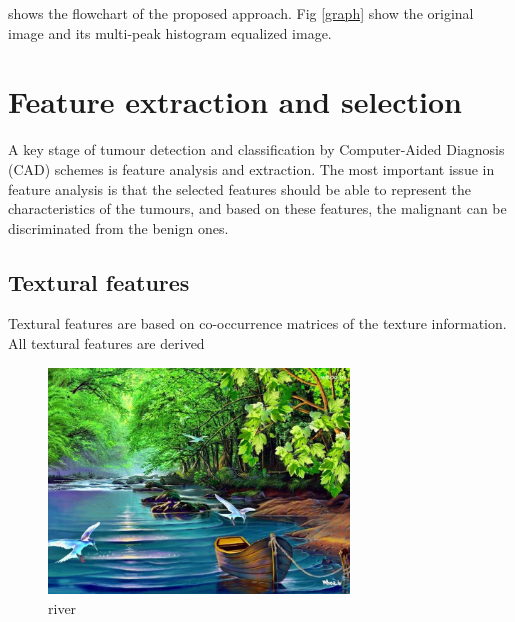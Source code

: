  shows the flowchart of the proposed approach. Fig \ref{graph} show the original image and its multi-peak histogram equalized image.
    
\section{ Feature extraction and selection} 

A key stage of tumour detection and classification by Computer-Aided Diagnosis (CAD) schemes is feature analysis and extraction. The most important issue in feature analysis is that the selected features should be able to represent the characteristics of the tumours, and based on these features, the malignant can be discriminated from the benign ones.
\subsection {Textural features}
Textural features are based on co-occurrence matrices of the texture information. All textural features are derived 
\begin{figure}[h]
\centering
\includegraphics[width=8cm]{chapters/river.jpg}
\caption{river}
\label{river}
\end{figure}


